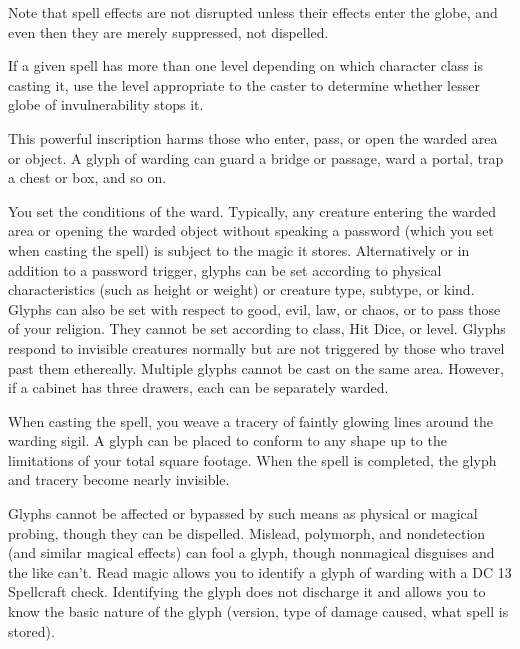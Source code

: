 \begin{multicols}{2}
\begin{small}
\smallskip\noindent Note that spell effects are not disrupted unless their effects enter the globe, and even then they are merely suppressed, not dispelled. 

\smallskip\noindent If a given spell has more than one level depending on which character class is casting it, use the level appropriate to the caster to determine whether lesser globe of invulnerability stops it.


\noindent This powerful inscription harms those who enter, pass, or open the warded area or object. A glyph of warding can guard a bridge or passage, ward a portal, trap a chest or box, and so on.

\smallskip\noindent You set the conditions of the ward. Typically, any creature entering the warded area or opening the warded object without speaking a password (which you set when casting the spell) is subject to the magic it stores. Alternatively or in addition to a password trigger, glyphs can be set according to physical characteristics (such as height or weight) or creature type, subtype, or kind. Glyphs can also be set with respect to good, evil, law, or chaos, or to pass those of your religion. They cannot be set according to class, Hit Dice, or level. Glyphs respond to invisible creatures normally but are not triggered by those who travel past them ethereally. Multiple glyphs cannot be cast on the same area. However, if a cabinet has three drawers, each can be separately warded.

\smallskip\noindent When casting the spell, you weave a tracery of faintly glowing lines around the warding sigil. A glyph can be placed to conform to any shape up to the limitations of your total square footage. When the spell is completed, the glyph and tracery become nearly invisible.

\smallskip\noindent Glyphs cannot be affected or bypassed by such means as physical or magical probing, though they can be dispelled. Mislead, polymorph, and nondetection (and similar magical effects) can fool a glyph, though nonmagical disguises and the like can't. Read magic allows you to identify a glyph of warding with a DC 13 Spellcraft check. Identifying the glyph does not discharge it and allows you to know the basic nature of the glyph (version, type of damage caused, what spell is stored).


\end{small}
\end{multicols}
